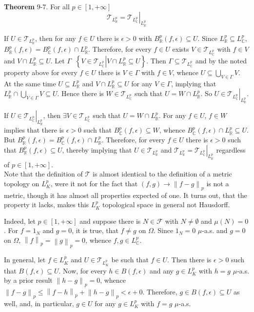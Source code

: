 \documentclass[a4paper]{article}
\newcommand{\obj}[1]{\left\{ #1 \right \}}
\newcommand{\clo}[1]{\left [ #1 \right ]}
\newcommand{\brac}[1]{\left ( #1 \right )}
\newcommand{\induc}[1]{\left . #1 \right \vert}
\newcommand{\nrm}[1]{\left\| #1 \right \|}
\newcommand{\Real}{\mathbb{R}}
\newcommand{\Cplx}{\mathbb{C}}
\newcommand{\Tcal}{\mathcal{T}}
\newcommand{\Fcal}{\mathcal{F}}
\newcommand{\defn}{\mathop{\overset{\Delta}{=}}\nolimits}
\begin{document}
\label{thm:L_p_K_topo} \noindent \textbf{Theorem} 9-7.
For all $p\in \clo{1, +\infty}$ \[\Tcal_{L^p_\Real} = \induc{\Tcal_{L^p_\Cplx}}_{L^p_\Real}\]

If $U\in \Tcal_{L^p_\Real}$, then for any $f\in U$ there is $\epsilon>0$ with $B^p_\Real\brac{f,\epsilon}\subseteq U$. Since $L^p_\Real\subseteq L^p_\Cplx$, $B^p_\Real\brac{f,\epsilon}=B^p_\Cplx\brac{f,\epsilon}\cap L^p_\Real$. Therefore, for every $f\in U$ exists $V\in \Tcal_{L^p_\Cplx}$ with $f\in V$ and $V\cap L^p_\Real \subseteq U$. Let $\Gamma\defn \obj{\induc{V\in \Tcal_{L^p_\Cplx}} V\cap L^p_\Real \subseteq U}$. Then $\Gamma\subseteq \Tcal_{L^p_\Cplx}$ and by the noted property above for every $f\in U$ there is $V\in \Gamma$ with $f\in V$, whence $U\subseteq \bigcup_{V\in \Gamma} V$. At the same time $U\subseteq L^p_\Real$ and $V\cap L^p_\Real \subseteq U$ for any $V\in \Gamma$, implying that $L^p_\Real \cap \bigcup_{V\in \Gamma} V \subseteq U$. Hence there is $W\in \Tcal_{L^p_\Cplx}$ such that $U = W\cap L^p_\Real$. So $U\in \induc{\Tcal_{L^p_\Cplx}}_{L^p_\Real}$.

If $U\in \induc{\Tcal_{L^p_\Cplx}}_{L^p_\Real}$, then $\exists V\in \Tcal_{L^p_\Cplx}$ such that $U=W\cap L^p_\Real$. For any $f\in U$, $f\in W$ implies that there is $\epsilon>0$ such that $B^p_\Cplx\brac{f, \epsilon}\subseteq W$, whence $B^p_\Cplx\brac{f, \epsilon}\cap L^p_\Real\subseteq U$. But $B^p_\Real\brac{f,\epsilon} = B^p_\Cplx\brac{f,\epsilon}\cap L^p_\Real$. Therefore, for every $f\in U$ there is $\epsilon>0$ such that $B^p_\Real\brac{f,\epsilon}\subseteq U$, thereby implying that $U\in \Tcal_{L^p_\Real}$ and $\Tcal_{L^p_\Real} = \induc{\Tcal_{L^p_\Cplx}}_{L^p_\Real}$ regardless of $p\in \clo{1,+\infty}$.\\

Note that the definition of $\Tcal$ is almost identical to the definition of a metric topology on $L^p_K$, were it not for the fact that $\brac{f,g}\to\nrm{f-g}_p$ is not a metric, though it has almost all properties expected of one. It turns out, that the property it lacks, makes this $L^p_K$ topological space in general not Hausdorff.

Indeed, let $p\in \clo{1,+\infty}$ and suppose there is $N\in \Fcal$ with $N\neq \emptyset$ and $\mu\brac{N}=0$. For $f=1_N$ and $g=0$, it is true, that $f\neq g$ on $\Omega$. Since $1_N=0$ $\mu$-a.s. and $g=0$ on $\Omega$, $\nrm{f}_p=\nrm{g}_p=0$, whence $f,g\in L^p_\Cplx$.

In general, let $f\in L^p_K$ and $U\in \Tcal_{L^p_K}$ be such that $f\in U$. Then there is $\epsilon>0$ such that $B\brac{f,\epsilon}\subseteq U$. Now, for every $h\in B\brac{f,\epsilon}$ and any $g\in L^p_K$ with $h=g$ $\mu$-a.s. by a prior result $\nrm{h-g}_p=0$, whence $\nrm{f-g}_p\leq \nrm{f-h}_p + \nrm{h-g}_p < \epsilon + 0$. Therefore, $g\in B\brac{f,\epsilon}\subseteq U$ as well, and, in particular, $g\in U$ for any $g\in L^p_K$ with $f=g$ $\mu$-a.s.
\end{document}
